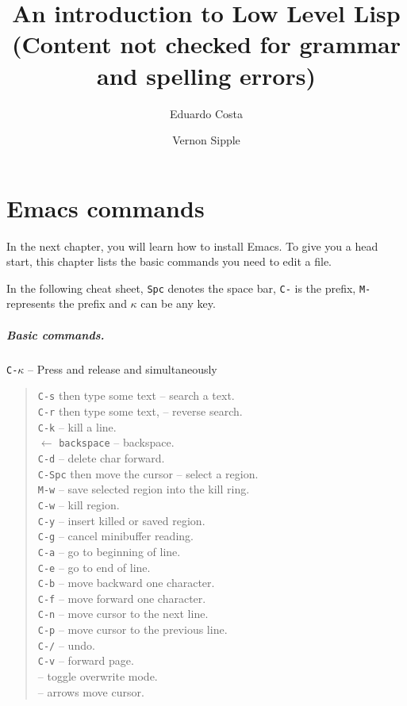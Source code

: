 \documentclass[a4paper,12pt]{book}
\title{An introduction to Low Level Lisp\\
{\normalsize (Content not checked for grammar and spelling errors)}}
\author{Eduardo Costa \and Vernon Sipple}
\date{}
\begin{document}
\maketitle
\thispagestyle{empty}

\mainmatter

\chapter{Emacs commands}
In the next chapter, you will learn how to install
Emacs. To give you a head start, this chapter
lists the basic commands you need to edit a file.

In the following cheat sheet, \verb|Spc| denotes
the space bar, \verb|C-| is the  prefix, \verb|M-| represents 
the   prefix and  $\kappa$ can be any key. 

\paragraph{Basic commands.} \verb|C-|$\kappa$ -- Press and release 
and \keys{$\kappa$} simultaneously
\begin{quote}
 \verb|C-s| then type some text -- search a text.\\
 \verb|C-r| then type some text, -- reverse search.\\
 \verb|C-k| -- kill a line.\\
 $\longleftarrow$ \verb|backspace| -- backspace.\\
 \verb|C-d| -- delete char forward.\\ 
 \verb|C-Spc| then move the cursor -- select a region.\\
 \verb|M-w| -- save selected region into the kill ring. \\
 \verb|C-w| -- kill region.\\
 \verb|C-y| -- insert killed or saved region.\\
 \verb|C-g| -- cancel minibuffer reading.\\
 \verb|C-a| -- go to beginning of line.\\
 \verb|C-e| -- go to end of line.\\
 \verb|C-b| -- move backward one character.\\
 \verb|C-f| -- move forward one character.\\
 \verb|C-n| -- move cursor to the next line.\\
 \verb|C-p| -- move cursor to the previous line.\\
 \verb|C-/| -- undo. \\
 \verb|C-v| -- forward page.\\
  -- toggle overwrite mode.\\
 \keys{$\leftarrow$} \keys{$\rightarrow$} \keys{$\uparrow$} \keys{$\downarrow$} -- arrows move cursor.\\
\end{quote}
\end{document}
